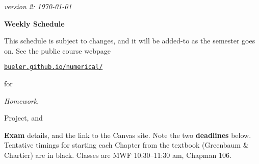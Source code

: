 \documentclass[12pt]{article}
\newcommand{\due}[1]{\strut {\color{BrickRed} \textsl{#1}}}
\newcommand{\proj}[1]{\strut {\color{RedOrange} #1}}
\newcommand{\ee}[1]{\strut {\color{Blue} \textbf{#1}}}
\newcommand{\dlinline}[1]{{\color{Purple} \textbf{#1}}}
\newcommand{\dl}[1]{{\small \dlinline{#1}}}
\begin{document}
\hfill \small \emph{version 2: \today} \normalsize

\bigskip\bigskip
\centerline{\Large \textbf{Weekly Schedule}}

\bigskip
This schedule is subject to changes, and it will be added-to as the semester goes on.  See the public course webpage

\medskip

\centerline{\href{https://bueler.github.io/numerical/index.html}{\texttt{bueler.github.io/numerical/}}}

\noindent for \due{Homework}, \proj{Project}, and \ee{Exam} details, and the link to the Canvas site.  Note the two \dl{deadlines} below.  Tentative timings for starting each Chapter from the textbook (Greenbaum \& Chartier) are in black.  Classes are MWF 10:30--11:30 am, Chapman 106.

\bigskip
\end{document}
